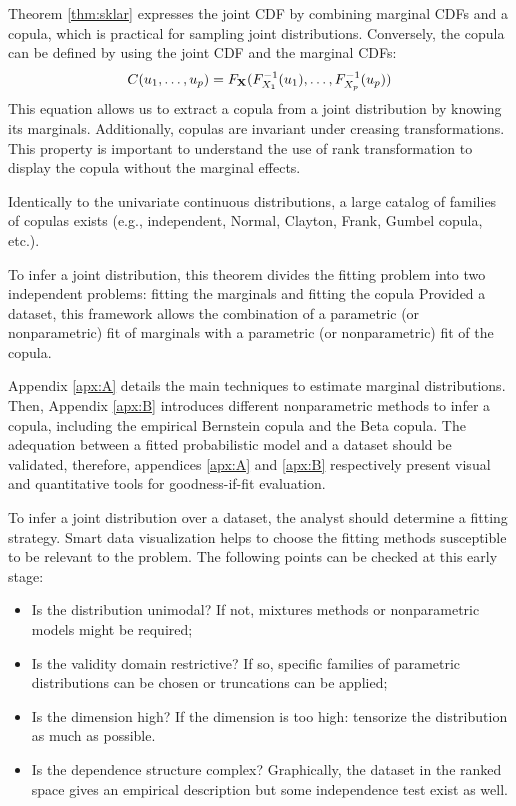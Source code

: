 Theorem \ref{thm:sklar} expresses the joint CDF by combining marginal CDFs and a copula, which is practical for sampling joint distributions. 
Conversely, the copula can be defined by using the joint CDF and the marginal CDFs: 
\begin{equation}
    C(u_1, \dots, u_p) = F_{{\bf X}}(F^{-1}_{X_1}(u_1), \dots, F^{-1}_{X_p}(u_p))
\end{equation}
This equation allows us to extract a copula from a joint distribution by knowing its marginals.
Additionally, copulas are invariant under creasing transformations. 
This property is important to understand the use of rank transformation to display the copula without the marginal effects.     


Identically to the univariate continuous distributions, a large catalog of families of copulas exists (e.g., independent, Normal, Clayton, Frank, Gumbel copula, etc.).


To infer a joint distribution, this theorem divides the fitting problem into two independent problems: fitting the marginals and fitting the copula
Provided a dataset, this framework allows the combination of a parametric (or nonparametric) fit of marginals with a parametric (or nonparametric) fit of the copula. 

Appendix \ref{apx:A} details the main techniques to estimate marginal distributions. 
Then, Appendix \ref{apx:B} introduces different nonparametric methods to infer a copula, including the empirical Bernstein copula and the Beta copula. 
The adequation between a fitted probabilistic model and a dataset should be validated, therefore, appendices \ref{apx:A} and \ref{apx:B} respectively present visual and quantitative tools for goodness-if-fit evaluation.

To infer a joint distribution over a dataset, the analyst should determine a fitting strategy.
Smart data visualization helps to choose the fitting methods susceptible to be relevant to the problem. 
The following points can be checked at this early stage: 
\begin{itemize}
    \item Is the distribution unimodal? If not, mixtures methods or nonparametric models might be required;
    \item Is the validity domain restrictive? If so, specific families of parametric distributions can be chosen or truncations can be applied;
    \item Is the dimension high? If the dimension is too high: tensorize the distribution as much as possible.
    \item Is the dependence structure complex? Graphically, the dataset in the ranked space gives an empirical description but some independence test exist as well. 
\end{itemize} 




